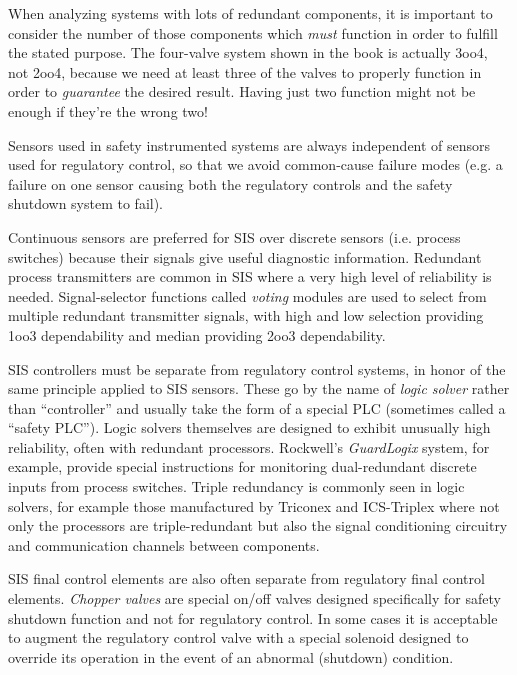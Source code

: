 \vskip 10pt

When analyzing systems with lots of redundant components, it is important to consider the number of those components which {\it must} function in order to fulfill the stated purpose.  The four-valve system shown in the book is actually 3oo4, not 2oo4, because we need at least three of the valves to properly function in order to {\it guarantee} the desired result.  Having just two function might not be enough if they're the wrong two!

\vskip 10pt

Sensors used in safety instrumented systems are always independent of sensors used for regulatory control, so that we avoid common-cause failure modes (e.g. a failure on one sensor causing both the regulatory controls and the safety shutdown system to fail).

Continuous sensors are preferred for SIS over discrete sensors (i.e. process switches) because their signals give useful diagnostic information.  Redundant process transmitters are common in SIS where a very high level of reliability is needed.  Signal-selector functions called {\it voting} modules are used to select from multiple redundant transmitter signals, with high and low selection providing 1oo3 dependability and median providing 2oo3 dependability.

\vskip 10pt

SIS controllers must be separate from regulatory control systems, in honor of the same principle applied to SIS sensors.  These go by the name of {\it logic solver} rather than ``controller'' and usually take the form of a special PLC (sometimes called a ``safety PLC'').  Logic solvers themselves are designed to exhibit unusually high reliability, often with redundant processors.  Rockwell's {\it GuardLogix} system, for example, provide special instructions for monitoring dual-redundant discrete inputs from process switches.  Triple redundancy is commonly seen in logic solvers, for example those manufactured by Triconex and ICS-Triplex where not only the processors are triple-redundant but also the signal conditioning circuitry and communication channels between components.

\vskip 10pt

SIS final control elements are also often separate from regulatory final control elements.  {\it Chopper valves} are special on/off valves designed specifically for safety shutdown function and not for regulatory control.  In some cases it is acceptable to augment the regulatory control valve with a special solenoid designed to override its operation in the event of an abnormal (shutdown) condition.

